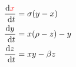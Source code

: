 \documentclass[preview]{standalone}
\begin{document}
\begin{center}
\[
            \begin{aligned}
            \frac{\mathrm{d} \textcolor{red}{x}}{\mathrm{~d} t} & =\sigma(y-x) \\
            \frac{\mathrm{d} y}{\mathrm{~d} t} & = x(\rho-z)-y \\
            \frac{\mathrm{d} z}{\mathrm{~d} t} & = x y-\beta z
            \end{aligned}
            \]
\end{center}
\end{document}
